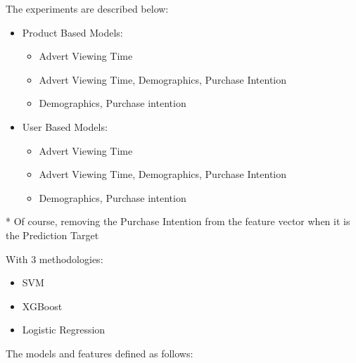\documentclass[review]{elsarticle}
\begin{document}
The experiments are described below:

\begin{itemize}
\item Product Based Models:
    \begin{itemize}
        \item Advert Viewing Time
        \item Advert Viewing Time, Demographics, Purchase Intention
        \item Demographics, Purchase intention
    \end{itemize}
\item User Based Models:
    \begin{itemize}
        \item Advert Viewing Time
        \item Advert Viewing Time, Demographics, Purchase Intention
        \item Demographics, Purchase intention
    \end{itemize}
\end{itemize}
* Of course, removing the Purchase Intention from the feature vector when it is the Prediction Target

With 3 methodologies:
\begin{itemize}
    \item SVM
    \item XGBoost
    \item Logistic Regression
\end{itemize}

The models and features defined as follows:
\end{document}
